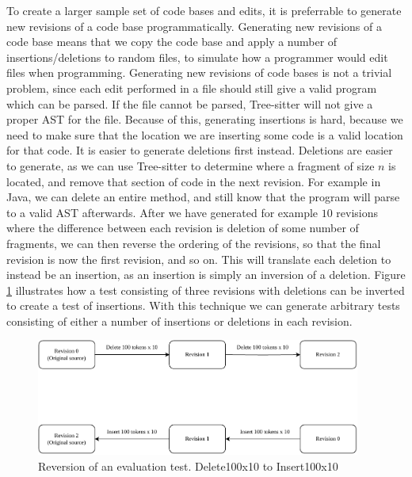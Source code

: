 To create a larger sample set of code bases and edits, it is preferrable to generate new
revisions of a code base programmatically. Generating new revisions of a code base means
that we copy the code base and apply a number of insertions/deletions to random files, to
simulate how a programmer would edit files when programming. Generating new revisions of
code bases is not a trivial problem, since each edit performed in a file should still give
a valid program which can be parsed. If the file cannot be parsed, Tree-sitter will not
give a proper AST for the file. Because of this, generating insertions is hard, because we
need to make sure that the location we are inserting some code is a valid location for
that code. It is easier to generate deletions first instead. Deletions are easier to
generate, as we can use Tree-sitter to determine where a fragment of size $n$ is located,
and remove that section of code in the next revision. For example in Java, we can delete
an entire method, and still know that the program will parse to a valid AST afterwards.
After we have generated for example $10$ revisions where the difference between each
revision is deletion of some number of fragments, we can then reverse the ordering of the
revisions, so that the final revision is now the first revision, and so on. This will
translate each deletion to instead be an insertion, as an insertion is simply an inversion
of a deletion. Figure \ref{fig:revisioninversion} illustrates how a test consisting of
three revisions with deletions can be inverted to create a test of insertions. With this
technique we can generate arbitrary tests consisting of either a number of insertions or
deletions in each revision.

\begin{figure}[t]
    \begin{center}
        \includegraphics[width=0.95\textwidth]{figures/revisioninversion.drawio.pdf}
    \end{center}
    \caption{Reversion of an evaluation test. Delete100x10 to Insert100x10}
    \label{fig:revisioninversion}
\end{figure}

